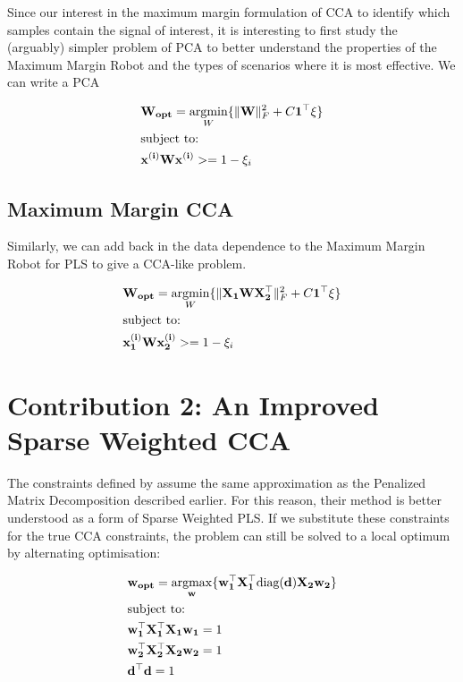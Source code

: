 Since our interest in the maximum margin formulation of CCA to identify which samples contain the signal of interest, it is interesting to first study the (arguably) simpler problem of PCA to better understand the properties of the Maximum Margin Robot and the types of scenarios where it is most effective. We can write a PCA 

\begin{align}
    & \bold{W_{opt}}=\underset{W}{\mathrm{argmin}}\{\|\bold{W}\|^2_F + C\bold{1}^{\top}\xi\}\\
    & \text{subject to:} \notag\\
    & \bold{x^{(i)} W x^{(i)}}  >=1-\xi_i \notag\\
\end{align}

\subsection{Maximum Margin CCA}

Similarly, we can add back in the data dependence to the Maximum Margin Robot for PLS to give a CCA-like problem.

\begin{align}
    & \bold{W_{opt}}=\underset{W}{\mathrm{argmin}}\{\|\bold{X_1WX_2^{\top}}\|^2_F + C\bold{1}^{\top}\xi\}\\
    & \text{subject to:} \notag\\
    & \bold{x^{(i)}_1 W x^{(i)}_2}  >=1-\xi_i \notag\\
\end{align}

\section{\textbf{Contribution 2:} An Improved Sparse Weighted CCA}

The constraints defined by \cite{wenwen2018sparse} assume the same approximation as the Penalized Matrix Decomposition described earlier. For this reason, their method is better understood as a form of Sparse Weighted PLS. If we substitute these constraints for the true CCA constraints, the problem can still be solved to a local optimum by alternating optimisation:

\begin{align}
    & \bold{w_{opt}}=\underset{\bold{w}}{\mathrm{argmax}}\{ \bold{w_1^{\top}X_1^{\top}\text{diag}(d)X_2w_2}  \}\\
    & \text{subject to:} \notag\\
    & \bold{w_1^{\top}X_1^{\top}X_1w_1}=1 \notag\\
    & \bold{w_2^{\top}X_2^{\top}X_2w_2}=1 \notag\\
    & \bold{d^{\top}d}=1 \notag
\end{align}

